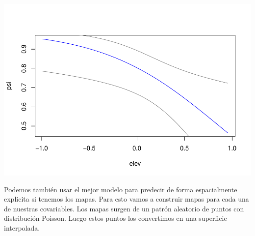 \documentclass[]{book}
\begin{document}
\includegraphics{Simul-Machalilla-book_files/figure-latex/graph_psi-1.pdf}

Podemos también usar el mejor modelo para predecir de forma
espacialmente explicita si tenemos los mapas. Para esto vamos a
construir mapas para cada una de nuestras covariables. Los mapas surgen
de un patrón aleatorio de puntos con distribución Poisson. Luego estos
puntos los convertimos en una superficie interpolada.
\end{document}
